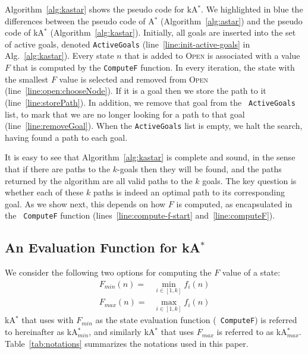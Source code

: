 \documentclass{aicom2e}
\newcommand{\astar}{A$^*$}
\newcommand{\kastar}{kA$^*$}
\newcommand{\kastarmin}{kA$^*_{min}$}
\newcommand{\kastarmax}{kA$^*_{max}$}
\newcommand{\open}{\textsc{Open}}
\begin{document}
Algorithm~\ref{alg:kastar} shows the pseudo code for \kastar{}. 
We highlighted in blue 
the differences between the pseudo code of \astar{} (Algorithm~\ref{alg:astar}) 
and the pseudo code of \kastar{} (Algorithm~\ref{alg:kastar}). 
Initially, all goals are inserted into the set of active goals, denoted  {\tt ActiveGoals} 
(line~\ref{line:init-active-goals} in Alg.~\ref{alg:kastar}). Every state
$n$ that is added to \open{} is associated with a value $F$ that is
computed by the {\tt ComputeF} function. In every iteration, the state with
the smallest $F$ value is selected and removed from \open{}
(line~\ref{line:open:chooseNode}). If it is a goal then we store the path to it
(line~\ref{line:storePath}). In addition, we remove that goal from the {\tt
ActiveGoals} list, to mark that we are no longer looking for a path to that
goal (line~\ref{line:removeGoal}). When the {\tt ActiveGoals} list is empty, we
halt the search, having found a path to each goal.

It is easy to see that Algorithm~\ref{alg:kastar} is complete and sound, in
the sense that if there are paths to the $k$-goals then they will be found, and the
paths returned by the algorithm are all valid paths to the $k$ goals. The key
question is whether each of these $k$ paths is indeed 
an optimal path to its corresponding goal. 
As we show next, this depends on how $F$ is computed, as encapsulated in the {\tt
ComputeF} function (lines~\ref{line:compute-f-start} and~\ref{line:computeF}).


\subsection{An Evaluation Function for \kastar{}}

We consider the following two options for computing the $F$ value of a state:
\begin{align}
F_{min}(n)=&\min_{i\in [1,k]}f_i(n) \\
F_{max}(n)=&\max_{i\in [1,k]}f_i(n)
\end{align}
\kastar{} that uses with $F_{min}$ as the state evaluation function ({\tt
ComputeF}) is referred to hereinafter as \kastarmin{}, and similarly \kastar{}
that uses $F_{max}$ is referred to as \kastarmax{}. Table~\ref{tab:notations}
summarizes the notations used in this paper.
\end{document}
